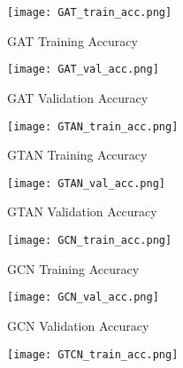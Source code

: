 \documentclass[lettersize,journal]{IEEEtran}
\theoremstyle{plain}
\theoremstyle{definition}
\theoremstyle{remark}
\begin{document}
\begin{figure}[ht]
	\begin{subfigure}[b]{0.235\textwidth}
		\begin{center}
			\texttt{[image: GAT\_train\_acc.png]}
			\caption{GAT Training Accuracy}
			\label{fig:GAT_train}
		\end{center}
	\end{subfigure}
	\begin{subfigure}[b]{0.235\textwidth}
		\begin{center}
			\texttt{[image: GAT\_val\_acc.png]}
			\caption{GAT Validation Accuracy}
			\label{fig:GAT_val}
		\end{center}
	\end{subfigure}
	\newline
	\begin{subfigure}[b]{0.235\textwidth}
		\begin{center}
			\texttt{[image: GTAN\_train\_acc.png]}
			\caption{GTAN Training Accuracy}
			\label{fig:GTAN_train}
		\end{center}
	\end{subfigure}
	\begin{subfigure}[b]{0.235\textwidth}
		\begin{center}
			\texttt{[image: GTAN\_val\_acc.png]}
			\caption{GTAN Validation Accuracy}
			\label{fig:GTAN_val}
		\end{center}
	\end{subfigure}
	\newline
	\begin{subfigure}[b]{0.235\textwidth}
		\begin{center}
			\texttt{[image: GCN\_train\_acc.png]}
			\caption{GCN Training Accuracy}
			\label{fig:GCN_train}
		\end{center}
	\end{subfigure}
	\begin{subfigure}[b]{0.235\textwidth}
		\begin{center}
			\texttt{[image: GCN\_val\_acc.png]}
			\caption{GCN Validation Accuracy}
			\label{fig:GCN_val}
		\end{center}
	\end{subfigure}
	\newline
	\begin{subfigure}[b]{0.235\textwidth}
		\begin{center}
			\texttt{[image: GTCN\_train\_acc.png]}

\end{center}
\end{subfigure}
\end{figure}
\end{document}
